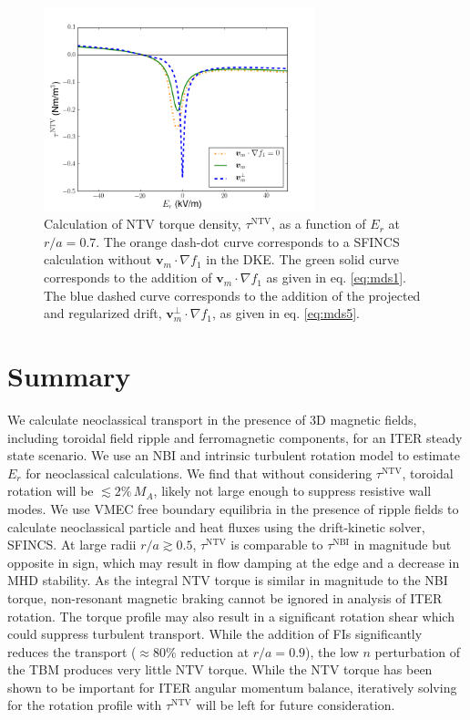 \documentclass[aip, pop, preprint]{revtex4-1}
\numberwithin{figure}{section}
\numberwithin{equation}{section}
\begin{document}
\begin{figure}[h!]
\centering
\includegraphics[width=0.7\textwidth]{mdscomparison.png}
\caption{\label{fig:driftschemes} Calculation of NTV torque density, $\tau^{\text{NTV}}$, as a function of $E_r$ at $r/a = 0.7$. The orange dash-dot curve corresponds to a SFINCS calculation without $\bm{v}_m \cdot \nabla f_1$ in the DKE. The green solid curve corresponds to the addition of $\bm{v}_m \cdot \nabla f_1$ as given in eq. \ref{eq:mds1}. The blue dashed curve corresponds to the addition of the projected and regularized drift, $\bm{v}^{\perp}_m \cdot \nabla f_1$, as given in eq. \ref{eq:mds5}.}
\end{figure}

\FloatBarrier

\section{Summary}\label{summary}

We calculate neoclassical transport in the presence of 3D magnetic fields, including toroidal field ripple and ferromagnetic components, for an ITER steady state scenario. We use an NBI and intrinsic turbulent rotation model to estimate $E_r$ for neoclassical calculations. We find that without considering $\tau^{\text{NTV}}$, toroidal rotation will be $\lesssim 2\% \,M_A$, likely not large enough to suppress resistive wall modes.\cite{Liu2004} We use VMEC free boundary equilibria in the presence of ripple fields to calculate neoclassical particle and heat fluxes using the drift-kinetic solver, SFINCS. At large radii $r/a \gtrsim 0.5$, $\tau^{\text{NTV}}$ is comparable to $\tau^{\text{NBI}}$ in magnitude but opposite in sign, which may result in flow damping at the edge and a decrease in MHD stability. As the integral NTV torque is similar in magnitude to the NBI torque, non-resonant magnetic braking cannot be ignored in analysis of ITER rotation. The torque profile may also result in a significant rotation shear which could suppress turbulent transport. While the addition of FIs significantly reduces the transport ($\approx 80\%$ reduction at $r/a = 0.9$), the low $n$ perturbation of the TBM produces very little NTV torque. While the NTV torque has been shown to be important for ITER angular momentum balance, iteratively solving for the rotation profile with $\tau^{\text{NTV}}$ will be left for future consideration.
\end{document}
